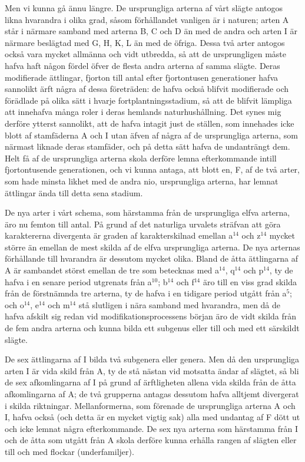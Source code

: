 Men vi kunna gå ännu längre. De ursprungliga arterna af vårt slägte antogos likna hvarandra i olika grad, såsom förhållandet vanligen är i naturen; arten A står i närmare samband med arterna B, C och D än med de andra och arten I är närmare beslägtad med G, H, K, L än med de öfriga. Dessa två arter antogos också vara mycket allmänna och vidt utbredda, så att de ursprungligen måste hafva haft någon fördel öfver de flesta andra arterna af samma slägte. Deras modifierade ättlingar, fjorton till antal efter fjortontusen generationer hafva sannolikt ärft några af dessa företräden: de hafva också blifvit modifierade och förädlade på olika sätt i hvarje fortplantningsstadium, så att de blifvit lämpliga att innehafva många roler i deras hemlands naturhushållning. Det synes mig derföre ytterst sannolikt, att de hafva intagit just de ställen, som innehades icke blott af stamfäderna A och I utan äfven af några af de ursprungliga arterna, som närmast liknade deras stamfäder, och på detta sätt hafva de undanträngt dem. Helt få af de ursprungliga arterna skola derföre lemna efterkommande intill fjortontusende generationen, och vi kunna antaga, att blott en, F, af de två arter, som hade minsta likhet med de andra nio, ursprungliga arterna, har lemnat ättlingar ända till detta sena stadium.

De nya arter i vårt schema, som härstamma från de ursprungliga elfva arterna, äro nu femton till antal. På grund af det naturliga urvalets sträfvan att göra karaktererna divergenta är graden af karakterskilnad emellan a${}^{14}$ och z${}^{14}$ mycket större än emellan de mest skilda af de elfva ursprungliga arterna. De nya arternas förhållande till hvarandra är dessutom mycket olika. Bland de åtta ättlingarna af A är sambandet störst emellan de tre som betecknas med a${}^{14}$, q${}^{14}$ och p${}^{14}$, ty de hafva i en senare period utgrenats från a${}^{10}$; b${}^{14}$ och f${}^{14}$ äro till en viss grad skilda från de förstnämnda tre arterna, ty de hafva i en tidigare period utgått från a${}^{5}$; och o${}^{14}$, e${}^{14}$ och m${}^{14}$ stå slutligen i nära samband med hvarandra, men då de hafva afskilt sig redan vid modifikationsprocessens början äro de vidt skilda från de fem andra arterna och kunna bilda ett subgenus eller till och med ett särskildt slägte.

De sex ättlingarna af I bilda två subgenera eller genera. Men då den ursprungliga arten I är vida skild från A, ty de stå nästan vid motsatta ändar af slägtet, så bli de sex afkomlingarna af I på grund af ärftligheten allena vida skilda från de åtta afkomlingarna af A; de två grupperna antagas dessutom hafva alltjemt divergerat i skilda riktningar. Mellanformerna, som förenade de ursprungliga arterna A och I, hafva också (och detta är en mycket vigtig sak) alla med undantag af F dött ut och icke lemnat några efterkommande. De sex nya arterna som härstamma från I och de åtta som utgått från A skola derföre kunna erhålla rangen af slägten eller till och med flockar (underfamiljer).

